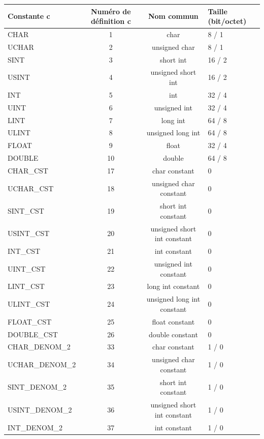 \documentclass[a4paper,12pt]{article}
\begin{document}
{{{\begin{table}
\hspace*{-2cm} \begin{tabular}{|l|c|c|l|} \hline
  \textbf{Constante c} & \textbf{Num\'ero de d\'efinition c} & \textbf{Nom commun}  & \textbf{Taille (bit/octet)} \\ \hline
   CHAR       &1   & char & 8 / 1\\ \hline
   UCHAR      &2   & unsigned char& 8 / 1\\ \hline
   SINT       &3   & short int & 16 / 2\\ \hline
   USINT      &4   & unsigned short int & 16 / 2\\ \hline
   INT        &5   & int & 32 / 4\\ \hline
   UINT       &6   & unsigned int & 32 / 4\\ \hline
   LINT       &7   & long int  & 64 / 8 \\ \hline
   ULINT      &8   & unsigned long int & 64 / 8 \\ \hline
   FLOAT      &9   & float  & 32 / 4 \\ \hline
   DOUBLE     &10  & double & 64 / 8 \\ \hline
   CHAR\_CST  &17  & char constant& 0\\ \hline
   UCHAR\_CST &18  & unsigned char constant& 0\\ \hline
   SINT\_CST  &19  & short int constant& 0\\ \hline
   USINT\_CST &20  & unsigned short int constant & 0\\ \hline
   INT\_CST   &21  & int constant & 0\\ \hline
   UINT\_CST  &22  & unsigned int constant & 0\\ \hline
   LINT\_CST  &23  & long int constant & 0 \\ \hline
   ULINT\_CST &24  & unsigned long int constant & 0 \\ \hline
   FLOAT\_CST &25  & float constant  & 0 \\ \hline
   DOUBLE\_CST&26  & double constant & 0 \\ \hline
   CHAR\_DENOM\_2  &33  & char constant& 1 / 0\\ \hline
   UCHAR\_DENOM\_2 &34  & unsigned char constant& 1 / 0\\ \hline
   SINT\_DENOM\_2  &35  & short int constant& 1 / 0\\ \hline
   USINT\_DENOM\_2 &36  & unsigned short int constant & 1 / 0\\ \hline
   INT\_DENOM\_2   &37  & int constant & 1 / 0\\ \hline

\end{tabular}
\end{table}}}}
\end{document}
